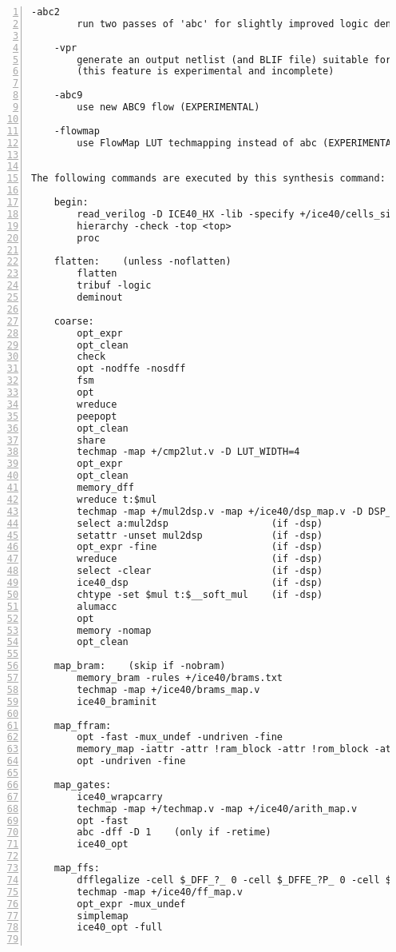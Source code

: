 \begin{lstlisting}[numbers=left,frame=single]
    -abc2
        run two passes of 'abc' for slightly improved logic density

    -vpr
        generate an output netlist (and BLIF file) suitable for VPR
        (this feature is experimental and incomplete)

    -abc9
        use new ABC9 flow (EXPERIMENTAL)

    -flowmap
        use FlowMap LUT techmapping instead of abc (EXPERIMENTAL)


The following commands are executed by this synthesis command:

    begin:
        read_verilog -D ICE40_HX -lib -specify +/ice40/cells_sim.v
        hierarchy -check -top <top>
        proc

    flatten:    (unless -noflatten)
        flatten
        tribuf -logic
        deminout

    coarse:
        opt_expr
        opt_clean
        check
        opt -nodffe -nosdff
        fsm
        opt
        wreduce
        peepopt
        opt_clean
        share
        techmap -map +/cmp2lut.v -D LUT_WIDTH=4
        opt_expr
        opt_clean
        memory_dff
        wreduce t:$mul
        techmap -map +/mul2dsp.v -map +/ice40/dsp_map.v -D DSP_A_MAXWIDTH=16 -D DSP_B_MAXWIDTH=16 -D DSP_A_MINWIDTH=2 -D DSP_B_MINWIDTH=2 -D DSP_Y_MINWIDTH=11 -D DSP_NAME=$__MUL16X16    (if -dsp)
        select a:mul2dsp                  (if -dsp)
        setattr -unset mul2dsp            (if -dsp)
        opt_expr -fine                    (if -dsp)
        wreduce                           (if -dsp)
        select -clear                     (if -dsp)
        ice40_dsp                         (if -dsp)
        chtype -set $mul t:$__soft_mul    (if -dsp)
        alumacc
        opt
        memory -nomap
        opt_clean

    map_bram:    (skip if -nobram)
        memory_bram -rules +/ice40/brams.txt
        techmap -map +/ice40/brams_map.v
        ice40_braminit

    map_ffram:
        opt -fast -mux_undef -undriven -fine
        memory_map -iattr -attr !ram_block -attr !rom_block -attr logic_block -attr syn_ramstyle=auto -attr syn_ramstyle=registers -attr syn_romstyle=auto -attr syn_romstyle=logic
        opt -undriven -fine

    map_gates:
        ice40_wrapcarry
        techmap -map +/techmap.v -map +/ice40/arith_map.v
        opt -fast
        abc -dff -D 1    (only if -retime)
        ice40_opt

    map_ffs:
        dfflegalize -cell $_DFF_?_ 0 -cell $_DFFE_?P_ 0 -cell $_DFF_?P?_ 0 -cell $_DFFE_?P?P_ 0 -cell $_SDFF_?P?_ 0 -cell $_SDFFCE_?P?P_ 0 -cell $_DLATCH_?_ x -mince -1
        techmap -map +/ice40/ff_map.v
        opt_expr -mux_undef
        simplemap
        ice40_opt -full


\end{lstlisting}
